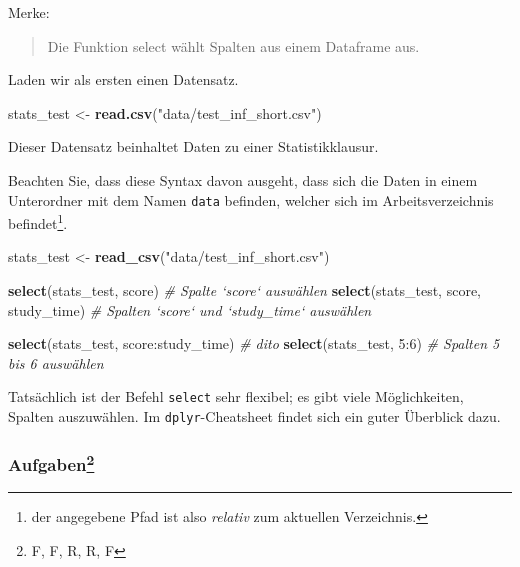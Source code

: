 \documentclass[12pt,ngerman,]{book}
\makeatletter
\newenvironment{Shaded}{\begin{snugshade}}{\end{snugshade}}
\newcommand{\KeywordTok}[1]{\textcolor[rgb]{0.13,0.29,0.53}{\textbf{{#1}}}}
\newcommand{\DecValTok}[1]{\textcolor[rgb]{0.00,0.00,0.81}{{#1}}}
\newcommand{\StringTok}[1]{\textcolor[rgb]{0.31,0.60,0.02}{{#1}}}
\newcommand{\CommentTok}[1]{\textcolor[rgb]{0.56,0.35,0.01}{\textit{{#1}}}}
\newcommand{\NormalTok}[1]{{#1}}
\let\rmarkdownfootnote\footnote%
\def\footnote{\protect\rmarkdownfootnote}
\newenvironment{kframe}{%
\medskip{}
\setlength{\fboxsep}{.8em}
 \def\at@end@of@kframe{}%
 \ifinner\ifhmode%
  \def\at@end@of@kframe{\end{minipage}}%
  \begin{minipage}{\columnwidth}%
 \fi\fi%
 \def\FrameCommand##1{\hskip\@totalleftmargin \hskip-\fboxsep
 \colorbox{shadecolor}{##1}\hskip-\fboxsep
     \hskip-\linewidth \hskip-\@totalleftmargin \hskip\columnwidth}%
 \MakeFramed {\advance\hsize-\width
   \@totalleftmargin\z@ \linewidth\hsize
   \@setminipage}}%
 {\par\unskip\endMakeFramed%
 \at@end@of@kframe}
\renewenvironment{Shaded}{\begin{kframe}}{\end{kframe}}
\makeatother
\begin{document}
Merke:

\begin{quote}
Die Funktion select wählt Spalten aus einem Dataframe aus.
\end{quote}

Laden wir als ersten einen Datensatz.

\begin{Shaded}
\begin{Highlighting}[]
\NormalTok{stats_test <-}\StringTok{ }\KeywordTok{read.csv}\NormalTok{(}\StringTok{"data/test_inf_short.csv"}\NormalTok{)}
\end{Highlighting}
\end{Shaded}

Dieser Datensatz beinhaltet Daten zu einer Statistikklausur.

Beachten Sie, dass diese Syntax davon ausgeht, dass sich die Daten in
einem Unterordner mit dem Namen \texttt{data} befinden, welcher sich im
Arbeitsverzeichnis befindet\footnote{der angegebene Pfad ist also
  \emph{relativ} zum aktuellen Verzeichnis.}.

\begin{Shaded}
\begin{Highlighting}[]

\NormalTok{stats_test <-}\StringTok{ }\KeywordTok{read_csv}\NormalTok{(}\StringTok{"data/test_inf_short.csv"}\NormalTok{)}
\end{Highlighting}
\end{Shaded}

\begin{Shaded}
\begin{Highlighting}[]
\KeywordTok{select}\NormalTok{(stats_test, score)  }\CommentTok{# Spalte `score` auswählen}
\KeywordTok{select}\NormalTok{(stats_test, score, study_time)  }
\CommentTok{# Spalten `score` und `study_time` auswählen}

\KeywordTok{select}\NormalTok{(stats_test, score:study_time) }\CommentTok{# dito}
\KeywordTok{select}\NormalTok{(stats_test, }\DecValTok{5}\NormalTok{:}\DecValTok{6}\NormalTok{)  }\CommentTok{# Spalten 5 bis 6 auswählen}
\end{Highlighting}
\end{Shaded}

Tatsächlich ist der Befehl \texttt{select} sehr flexibel; es gibt viele
Möglichkeiten, Spalten auszuwählen. Im \texttt{dplyr}-Cheatsheet findet
sich ein guter Überblick dazu.

\subsubsection[Aufgaben]{\texorpdfstring{Aufgaben\footnote{F, F, R, R, F}}{Aufgaben}}\label{aufgaben-4}
\end{document}
